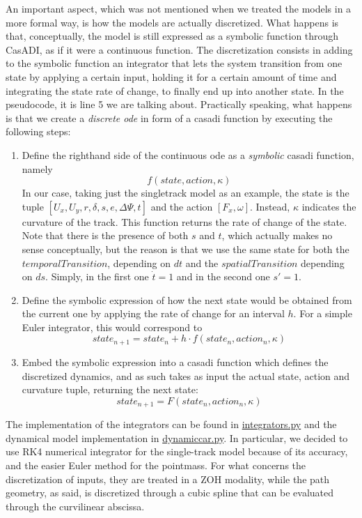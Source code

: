 \documentclass[a4paper, onecolumn, 12pt]{article}
\begin{document}
An important aspect, which was not mentioned when we treated the models in a
more formal way, is how the models are actually discretized.  What happens is
that, conceptually, the model is still expressed as a symbolic function through
CasADI, as if it were a continuous function. The discretization consists in
adding to the symbolic function an integrator that lets the system transition
from one state by applying a certain input, holding it for a certain amount of
time and integrating the state rate of change, to finally end up into another
state. In the pseudocode, it is line 5 we are talking about. Practically
speaking, what happens is that we create a \textit{discrete ode} in form of a
casadi function by executing the following steps:
\begin{enumerate}
    \item Define the righthand side of the continuous ode as a \textit{symbolic}
    casadi function, namely \[f(state,action,\kappa)\] In our case, taking just
    the singletrack model as an example, the state is the tuple
    \([U_x,U_y,r,\delta,s,e,\Delta\varPsi,t]\) and the action \([F_x,\omega]\).
    Instead, $\kappa$ indicates the curvature of the track. This function
    returns the rate of change of the state. Note that there is the presence of
    both $s$ and $t$, which actually makes no sense conceptually, but the reason
    is that we use the same state for both the $temporalTransition$, depending
    on $dt$ and the $spatialTransition$ depending on $ds$. Simply, in the first
    one $\dot t=1$ and in the second one $s'=1$.
    \item Define the symbolic expression of how the next state would be obtained
    from the current one by applying the rate of change for an interval $h$. For a
    simple Euler integrator, this would correspond to \[state_{n+1}=state_n+h \cdot f(state_n,action_n,\kappa)\]
    \item Embed the symbolic expression into a casadi function which defines the
    discretized dynamics, and as such takes as input the actual state, action
    and curvature tuple, returning the next state: \[state_{n+1}=F(state_n,action_n,\kappa)\]
\end{enumerate}

The implementation of the integrators can be found in
\href{https://github.com/neverorfrog/vehicle-control/blob/main/utils/integrators.py}{integrators.py}
and the dynamical model implementation in
\href{https://github.com/neverorfrog/vehicle-control/blob/main/models/dynamic_car.py}{dynamiccar.py}.
In particular, we decided to use RK4 numerical integrator for the single-track
model because of its accuracy, and the easier Euler method for the pointmass.
For what concerns the discretization of inputs, they are treated in a ZOH
modality, while the path geometry, as said, is discretized through a cubic
spline that can be evaluated through the curvilinear abscissa.
\end{document}
